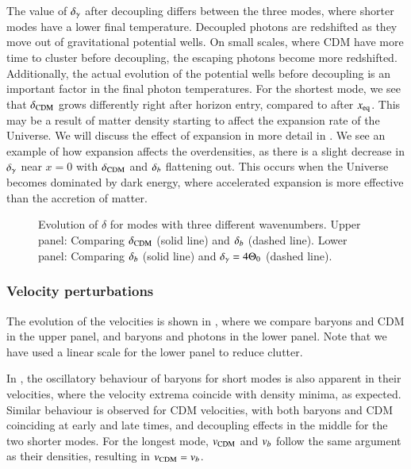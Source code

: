 The value of $\delta_\gamma$ after decoupling differs between the three modes, where shorter modes have a lower final temperature. Decoupled photons are redshifted as they move out of gravitational potential wells. On small scales, where CDM have more time to cluster before decoupling, the escaping photons become more redshifted. Additionally, the actual evolution of the potential wells before decoupling is an important factor in the final photon temperatures. For the shortest mode, we see that $\delta_\mathrm{CDM}$ grows differently right after horizon entry, compared to after $x_\mathrm{eq}$. This may be a result of matter density starting to affect the expansion rate of the Universe. We will discuss the effect of expansion in more detail in . We see an example of how expansion affects the overdensities, as there is a slight decrease in $\delta_\gamma$ near $x=0$ with $\delta_\mathrm{CDM}$ and $\delta_b$ flattening out. This occurs when the Universe becomes dominated by dark energy, where accelerated expansion is more effective than the accretion of matter. 
\begin{figure}[ht!]
    \caption{Evolution of $\delta$ for modes with three different wavenumbers. Upper panel: Comparing $\delta_\mathrm{CDM}$ (solid line) and $\delta_b$ (dashed line). Lower panel: Comparing $\delta_b$ (solid line) and $\delta_\gamma=4\Theta_0$ (dashed line).}
    \label{fig:M3:results:deltas}
\end{figure}


\subsubsection{Velocity perturbations}\label{sssec:M3:results:velocity_perturbations}
The evolution of the velocities is shown in , where we compare baryons and CDM in the upper panel, and baryons and photons in the lower panel. Note that we have used a linear scale for the lower panel to reduce clutter.   

In , the oscillatory behaviour of baryons for short modes is also apparent in their velocities, where the velocity extrema coincide with density minima, as expected. Similar behaviour is observed for CDM velocities, with both baryons and CDM coinciding at early and late times, and decoupling effects in the middle for the two shorter modes. For the longest mode, $v_\mathrm{CDM}$ and $v_b$ follow the same argument as their densities, resulting in $v_\mathrm{CDM}=v_b$. 

